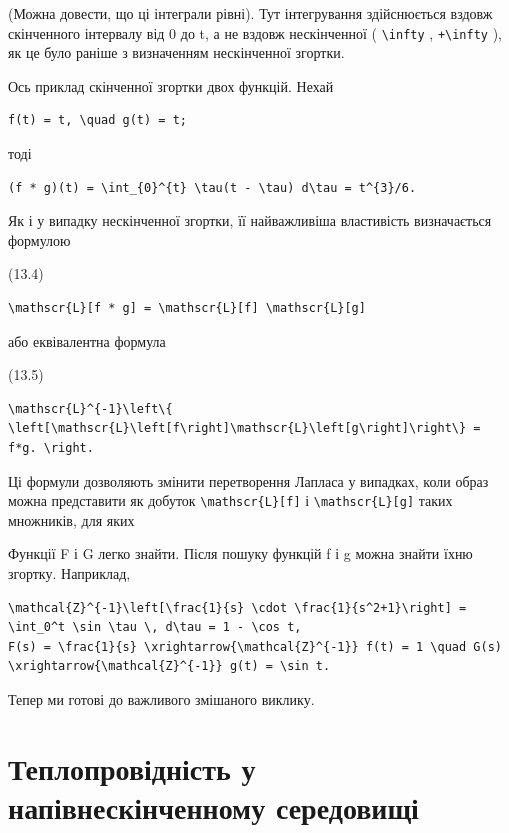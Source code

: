 \documentclass[
  ukrainian,
]{article}
\begin{document}
(Можна довести, що ці інтеграли рівні). Тут інтегрування здійснюється
вздовж скінченного інтервалу від 0 до t, а не вздовж нескінченної (
\texttt{\textbackslash{}infty} , \texttt{+\textbackslash{}infty} ), як
це було раніше з визначенням нескінченної згортки.

Ось приклад скінченної згортки двох функцій. Нехай

\begin{verbatim}
f(t) = t, \quad g(t) = t;
\end{verbatim}

тоді

\begin{verbatim}
(f * g)(t) = \int_{0}^{t} \tau(t - \tau) d\tau = t^{3}/6.
\end{verbatim}

Як і у випадку нескінченної згортки, її найважливіша властивість
визначається формулою

(13.4)

\begin{verbatim}
\mathscr{L}[f * g] = \mathscr{L}[f] \mathscr{L}[g]
\end{verbatim}

або еквівалентна формула

(13.5)

\begin{verbatim}
\mathscr{L}^{-1}\left\{ \left[\mathscr{L}\left[f\right]\mathscr{L}\left[g\right]\right\} = f*g. \right.
\end{verbatim}

Ці формули дозволяють змінити перетворення Лапласа у випадках, коли
образ можна представити як добуток
\texttt{\textbackslash{}mathscr\{L\}{[}f{]}} і
\texttt{\textbackslash{}mathscr\{L\}{[}g{]}} таких множників, для яких

Функції F і G легко знайти. Після пошуку функцій f і g можна знайти їхню
згортку. Наприклад,

\begin{verbatim}
\mathcal{Z}^{-1}\left[\frac{1}{s} \cdot \frac{1}{s^2+1}\right] = \int_0^t \sin \tau \, d\tau = 1 - \cos t,
F(s) = \frac{1}{s} \xrightarrow{\mathcal{Z}^{-1}} f(t) = 1 \quad G(s) \xrightarrow{\mathcal{Z}^{-1}} g(t) = \sin t.
\end{verbatim}

Тепер ми готові до важливого змішаного виклику.

\section{Теплопровідність у напівнескінченному
середовищі}\label{ux442ux435ux43fux43bux43eux43fux440ux43eux432ux456ux434ux43dux456ux441ux442ux44c-ux443-ux43dux430ux43fux456ux432ux43dux435ux441ux43aux456ux43dux447ux435ux43dux43dux43eux43cux443-ux441ux435ux440ux435ux434ux43eux432ux438ux449ux456}
\end{document}
